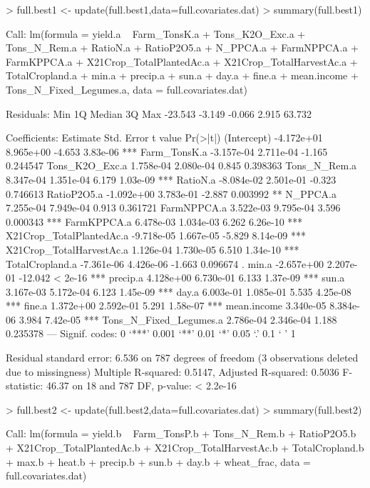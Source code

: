 \documentclass{report}
\begin{document}
\begin{Schunk}
\begin{Sinput}
> full.best1 <- update(full.best1,data=full.covariates.dat)
> summary(full.best1)
\end{Sinput}
\begin{Soutput}
Call:
lm(formula = yield.a ~ Farm_TonsK.a + Tons_K2O_Exc.a + Tons_N_Rem.a + 
    RatioN.a + RatioP2O5.a + N_PPCA.a + FarmNPPCA.a + FarmKPPCA.a + 
    X21Crop_TotalPlantedAc.a + X21Crop_TotalHarvestAc.a + TotalCropland.a + 
    min.a + precip.a + sun.a + day.a + fine.a + mean.income + 
    Tons_N_Fixed_Legumes.a, data = full.covariates.dat)

Residuals:
    Min      1Q  Median      3Q     Max 
-23.543  -3.149  -0.066   2.915  63.732 

Coefficients:
                           Estimate Std. Error t value Pr(>|t|)    
(Intercept)              -4.172e+01  8.965e+00  -4.653 3.83e-06 ***
Farm_TonsK.a             -3.157e-04  2.711e-04  -1.165 0.244547    
Tons_K2O_Exc.a            1.758e-04  2.080e-04   0.845 0.398363    
Tons_N_Rem.a              8.347e-04  1.351e-04   6.179 1.03e-09 ***
RatioN.a                 -8.084e-02  2.501e-01  -0.323 0.746613    
RatioP2O5.a              -1.092e+00  3.783e-01  -2.887 0.003992 ** 
N_PPCA.a                  7.255e-04  7.949e-04   0.913 0.361721    
FarmNPPCA.a               3.522e-03  9.795e-04   3.596 0.000343 ***
FarmKPPCA.a               6.478e-03  1.034e-03   6.262 6.26e-10 ***
X21Crop_TotalPlantedAc.a -9.718e-05  1.667e-05  -5.829 8.14e-09 ***
X21Crop_TotalHarvestAc.a  1.126e-04  1.730e-05   6.510 1.34e-10 ***
TotalCropland.a          -7.361e-06  4.426e-06  -1.663 0.096674 .  
min.a                    -2.657e+00  2.207e-01 -12.042  < 2e-16 ***
precip.a                  4.128e+00  6.730e-01   6.133 1.37e-09 ***
sun.a                     3.167e-03  5.172e-04   6.123 1.45e-09 ***
day.a                     6.003e-01  1.085e-01   5.535 4.25e-08 ***
fine.a                    1.372e+00  2.592e-01   5.291 1.58e-07 ***
mean.income               3.340e-05  8.384e-06   3.984 7.42e-05 ***
Tons_N_Fixed_Legumes.a    2.786e-04  2.346e-04   1.188 0.235378    
---
Signif. codes:  0 ‘***’ 0.001 ‘**’ 0.01 ‘*’ 0.05 ‘.’ 0.1 ‘ ’ 1

Residual standard error: 6.536 on 787 degrees of freedom
  (3 observations deleted due to missingness)
Multiple R-squared:  0.5147,	Adjusted R-squared:  0.5036 
F-statistic: 46.37 on 18 and 787 DF,  p-value: < 2.2e-16
\end{Soutput}
\begin{Sinput}
> full.best2 <- update(full.best2,data=full.covariates.dat)
> summary(full.best2)
\end{Sinput}
\begin{Soutput}
Call:
lm(formula = yield.b ~ Farm_TonsP.b + Tons_N_Rem.b + RatioP2O5.b + 
    X21Crop_TotalPlantedAc.b + X21Crop_TotalHarvestAc.b + TotalCropland.b + 
    max.b + heat.b + precip.b + sun.b + day.b + wheat_frac, data = full.covariates.dat)


\end{Soutput}
\end{Schunk}
\end{document}
